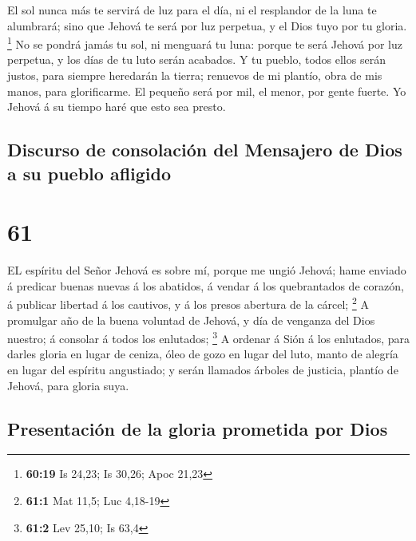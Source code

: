  El sol nunca más te servirá de luz para el día, ni el
resplandor de la luna te alumbrará; sino que Jehová te será por luz
perpetua, y el Dios tuyo por tu gloria. \footnote{\textbf{60:19} Is
  24,23; Is 30,26; Apoc 21,23}  No se pondrá jamás tu sol,
ni menguará tu luna: porque te será Jehová por luz perpetua, y los días
de tu luto serán acabados.  Y tu pueblo, todos ellos serán
justos, para siempre heredarán la tierra; renuevos de mi plantío, obra
de mis manos, para glorificarme.  El pequeño será por mil,
el menor, por gente fuerte. Yo Jehová á su tiempo haré que esto sea
presto.

\hypertarget{discurso-de-consolaciuxf3n-del-mensajero-de-dios-a-su-pueblo-afligido}{%
\subsection{Discurso de consolación del Mensajero de Dios a su pueblo
afligido}\label{discurso-de-consolaciuxf3n-del-mensajero-de-dios-a-su-pueblo-afligido}}

\hypertarget{section-60}{%
\section{61}\label{section-60}}

 EL espíritu del Señor Jehová es sobre mí, porque me ungió
Jehová; hame enviado á predicar buenas nuevas á los abatidos, á vendar á
los quebrantados de corazón, á publicar libertad á los cautivos, y á los
presos abertura de la cárcel; \footnote{\textbf{61:1} Mat 11,5; Luc
  4,18-19}  A promulgar año de la buena voluntad de Jehová,
y día de venganza del Dios nuestro; á consolar á todos los enlutados;
\footnote{\textbf{61:2} Lev 25,10; Is 63,4}  A ordenar á
Sión á los enlutados, para darles gloria en lugar de ceniza, óleo de
gozo en lugar del luto, manto de alegría en lugar del espíritu
angustiado; y serán llamados árboles de justicia, plantío de Jehová,
para gloria suya.

\hypertarget{presentaciuxf3n-de-la-gloria-prometida-por-dios}{%
\subsection{Presentación de la gloria prometida por
Dios}\label{presentaciuxf3n-de-la-gloria-prometida-por-dios}}

